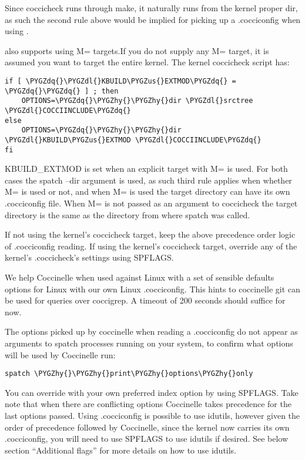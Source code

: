 \documentclass[a4paper,8pt,english]{sphinxmanual}
\def\PYGZus{\char`\_}
\def\PYGZdl{\char`\$}
\def\PYGZhy{\char`\-}
\def\PYGZdq{\char`\"}
\begin{document}
Since coccicheck runs through make, it naturally runs from the kernel
proper dir, as such the second rule above would be implied for picking up a
.cocciconfig when using .

 also supports using M= targets.If you do not supply
any M= target, it is assumed you want to target the entire kernel.
The kernel coccicheck script has:

\begin{Verbatim}[commandchars=\\\{\}]
if [ \PYGZdq{}\PYGZdl{}KBUILD\PYGZus{}EXTMOD\PYGZdq{} = \PYGZdq{}\PYGZdq{} ] ; then
    OPTIONS=\PYGZdq{}\PYGZhy{}\PYGZhy{}dir \PYGZdl{}srctree \PYGZdl{}COCCIINCLUDE\PYGZdq{}
else
    OPTIONS=\PYGZdq{}\PYGZhy{}\PYGZhy{}dir \PYGZdl{}KBUILD\PYGZus{}EXTMOD \PYGZdl{}COCCIINCLUDE\PYGZdq{}
fi
\end{Verbatim}

KBUILD\_EXTMOD is set when an explicit target with M= is used. For both cases
the spatch --dir argument is used, as such third rule applies when whether M=
is used or not, and when M= is used the target directory can have its own
.cocciconfig file. When M= is not passed as an argument to coccicheck the
target directory is the same as the directory from where spatch was called.

If not using the kernel's coccicheck target, keep the above precedence
order logic of .cocciconfig reading. If using the kernel's coccicheck target,
override any of the kernel's .coccicheck's settings using SPFLAGS.

We help Coccinelle when used against Linux with a set of sensible defaults
options for Linux with our own Linux .cocciconfig. This hints to coccinelle
git can be used for  queries over coccigrep. A timeout of 200
seconds should suffice for now.

The options picked up by coccinelle when reading a .cocciconfig do not appear
as arguments to spatch processes running on your system, to confirm what
options will be used by Coccinelle run:

\begin{Verbatim}[commandchars=\\\{\}]
spatch \PYGZhy{}\PYGZhy{}print\PYGZhy{}options\PYGZhy{}only
\end{Verbatim}

You can override with your own preferred index option by using SPFLAGS. Take
note that when there are conflicting options Coccinelle takes precedence for
the last options passed. Using .cocciconfig is possible to use idutils, however
given the order of precedence followed by Coccinelle, since the kernel now
carries its own .cocciconfig, you will need to use SPFLAGS to use idutils if
desired. See below section ``Additional flags'' for more details on how to use
idutils.
\end{document}
